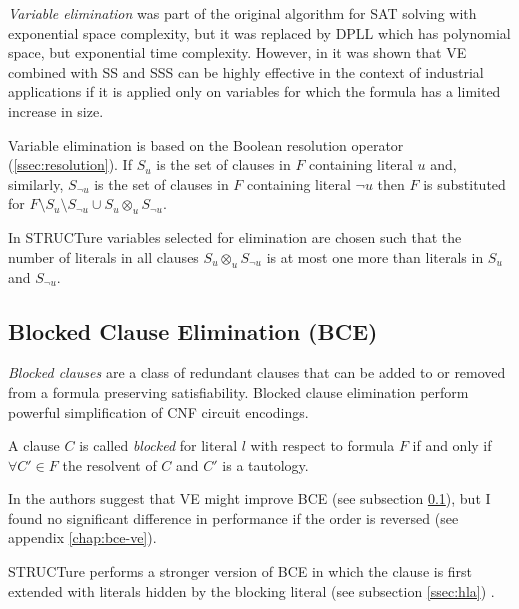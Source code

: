 \emph{Variable elimination} \cite{Davis:1960:CPQ:321033.321034}
was part of the original algorithm for SAT solving with exponential
space complexity, but it was replaced by DPLL which has
polynomial space, but exponential time complexity. However, in
\cite{Subbarayan04niver:non,Een05effectivepreprocessing} it was
shown that VE combined with SS and SSS can be highly effective in
the context of industrial applications if it is applied only on
variables for which the formula has a limited increase in size.

Variable elimination is based on the Boolean resolution operator
(\ref{ssec:resolution}). If $S_u$ is the set of clauses in $F$
containing literal $u$ and, similarly, $S_{\neg u}$ is the set of clauses in $F$
containing literal ${\neg u}$ then $F$ is substituted for
$F \setminus S_u \setminus S_{\neg u} \cup S_u \otimes_{u} S_{\neg u}$.

In STRUCTure variables selected for elimination are chosen such that
the number of literals in all clauses $S_u \otimes_{u} S_{\neg u}$
is at most one more than literals in $S_u$ and $S_{\neg u}$.


\subsection{Blocked Clause Elimination (BCE)}
\label{ssec:bce}

\emph{Blocked clauses} are a class of redundant clauses
that can be added to \cite{Kullmann:1999:NMD:312269.312271} or
removed from \cite{Jarvisalo_blockedclause} a formula preserving
satisfiability. Blocked clause elimination perform powerful
simplification of CNF circuit encodings.

\begin{mydef}
  A clause $C$ is called \emph{blocked}
  for literal $l$ with respect to formula $F$ if and only if $\forall
  C' \in F$ the resolvent of $C$ and $C'$ is a tautology.
\end{mydef}


In \cite{Jarvisalo_blockedclause} the authors suggest that VE might
improve BCE (see subsection \ref{ssec:bce}), but I found no significant
difference in performance if the order is reversed (see appendix
\ref{chap:bce-ve}).

STRUCTure performs a stronger version of BCE in which the clause
is first extended with literals hidden by the blocking literal
(see subsection \ref{ssec:hla}) \cite{Heule_coveredclause}.
